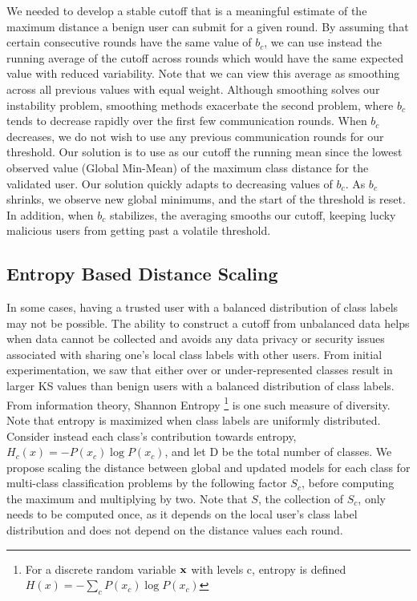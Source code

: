 \documentclass{article} %
\begin{document}
We needed to develop a stable cutoff that is a meaningful estimate of the maximum distance a benign user can submit for a given round. By assuming that certain consecutive rounds have the same value of $b_c$, we can use instead the running average of the cutoff across rounds which would have the same expected value with reduced variability. Note that we can view this average as smoothing across all previous values with equal weight. Although smoothing solves our instability problem, smoothing methods exacerbate the second problem, where $b_c$ tends to decrease rapidly over the first few communication rounds. When $b_c$ decreases, we do not wish to use any previous communication rounds for our threshold. Our solution is to use as our cutoff the running mean since the lowest observed value (Global Min-Mean) of the maximum class distance for the validated user. Our solution quickly adapts to decreasing values of $b_c$. As $b_c$ shrinks, we observe new global minimums, and the start of the threshold is reset. In addition, when $b_c$ stabilizes, the averaging smooths our cutoff, keeping lucky malicious users from getting past a volatile threshold.

%
\subsection{Entropy Based Distance Scaling}

In some cases, having a trusted user with a balanced distribution of class labels may not be possible. The ability to construct a cutoff from unbalanced data helps when data cannot be collected and avoids any data privacy or security issues associated with sharing one's local class labels with other users. From initial experimentation, we saw that either over or under-represented classes result in larger KS values than benign users with a balanced distribution of class labels. From information theory, Shannon Entropy \footnote{For a discrete random variable ${\mathbf{x}}$ with levels c, entropy is defined $H(x) = - \sum_c P(x_c) \log P(x_c)$} is one such measure of diversity. Note that entropy is maximized when class labels are uniformly distributed. Consider instead each class's contribution towards entropy, $H_c(x) = - P(x_c) \log P(x_c)$, and let D be the total number of classes. We propose scaling the distance between global and updated models for each class for multi-class classification problems by the following factor $S_c$, before computing the maximum and multiplying by two. Note that $S$, the collection of $S_c$, only needs to be computed once, as it depends on the local user's class label distribution and does not depend on the distance values each round.
\end{document}
